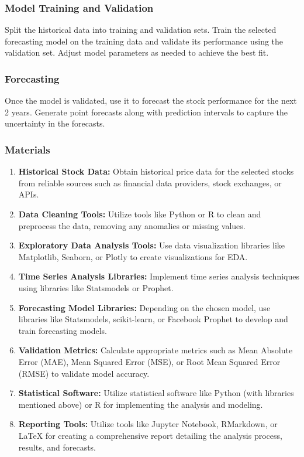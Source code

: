 \subsubsection{Model Training and Validation}
Split the historical data into training and validation sets. Train the selected forecasting model on the training data and validate its performance using the validation set. Adjust model parameters as needed to achieve the best fit.

\subsubsection{Forecasting}
Once the model is validated, use it to forecast the stock performance for the next 2 years. Generate point forecasts along with prediction intervals to capture the uncertainty in the forecasts.

\subsubsection{Materials}
\begin{enumerate}
    \item \textbf{Historical Stock Data:} Obtain historical price data for the selected stocks from reliable sources such as financial data providers, stock exchanges, or APIs.
    \item \textbf{Data Cleaning Tools:} Utilize tools like Python or R to clean and preprocess the data, removing any anomalies or missing values.
    \item \textbf{Exploratory Data Analysis Tools:} Use data visualization libraries like Matplotlib, Seaborn, or Plotly to create visualizations for EDA.
    \item \textbf{Time Series Analysis Libraries:} Implement time series analysis techniques using libraries like Statsmodels or Prophet.
    \item \textbf{Forecasting Model Libraries:} Depending on the chosen model, use libraries like Statsmodels, scikit-learn, or Facebook Prophet to develop and train forecasting models.
    \item \textbf{Validation Metrics:} Calculate appropriate metrics such as Mean Absolute Error (MAE), Mean Squared Error (MSE), or Root Mean Squared Error (RMSE) to validate model accuracy.
    \item \textbf{Statistical Software:} Utilize statistical software like Python (with libraries mentioned above) or R for implementing the analysis and modeling.
    \item \textbf{Reporting Tools:} Utilize tools like Jupyter Notebook, RMarkdown, or LaTeX for creating a comprehensive report detailing the analysis process, results, and forecasts.
\end{enumerate}
